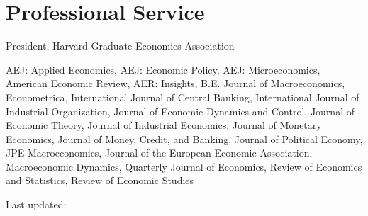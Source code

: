 \documentclass[letterpaper]{article}
\def\footerlink{}
\begin{document}
\section*{Professional Service}
\begin{description}[labelindent=0pt, labelwidth=0.7in, labelsep*=1em, leftmargin =!, font=\normalfont]
\item[2020--21] President, Harvard Graduate Economics Association
\item[Refereeing] {AEJ: Applied Economics, AEJ: Economic Policy, AEJ: Microeconomics, American Economic Review, AER: Insights, B.E. Journal of Macroeconomics, Econometrica, International Journal of Central Banking, International Journal of Industrial Organization, Journal of Economic Dynamics and Control, Journal of Economic Theory, Journal of Industrial Economics, Journal of Monetary Economics, Journal of Money, Credit, and Banking, Journal of Political Economy, JPE Macroeconomics, Journal of the European Economic Association, Macroeconomic Dynamics, Quarterly Journal of Economics, Review of Economics and Statistics, Review of Economic Studies}
\end{description}

Last updated: {\monthname[\month] \the\year}


\end{document}
